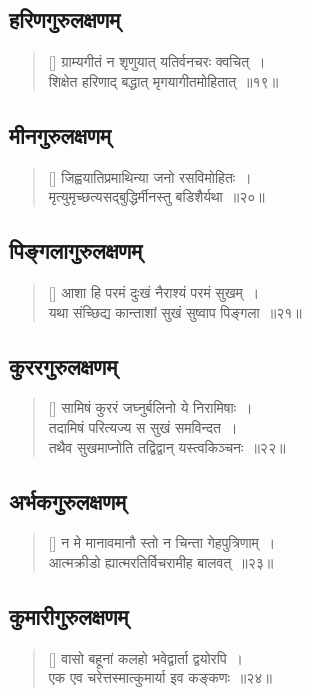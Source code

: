 \documentclass[twoside,12pt,notitlepage]{book}
\begin{document}
\subsection*{हरिणगुरुलक्षणम्}
\begin{verse}[\versewidth]
ग्राम्यगीतं न शृणुयात् यतिर्वनचरः क्वचित्~।\\[-6pt]
शिक्षेत हरिणाद् बद्धात् मृगयागीतमोहितात्~॥१९॥\footA 
\end{verse}


\subsection*{मीनगुरुलक्षणम्}
\begin{verse}[\versewidth]
जिह्वयातिप्रमाथिन्या जनो रसविमोहितः~।\\[-6pt]
मृत्युमृच्छत्यसद्बुद्धिर्मीनस्तु बडिशैर्यथा~॥२०॥\footA 
\end{verse}


\subsection*{पिङ्गलागुरुलक्षणम्}
\begin{verse}[\versewidth]
आशा हि परमं दुःखं नैराश्यं परमं सुखम्~। \\[-6pt]
यथा संच्छिद्य कान्ताशां सुखं सुष्वाप पिङ्गला~॥२१॥\footA 
\end{verse}


\subsection*{कुररगुरुलक्षणम्}
\begin{verse}[\versewidth]
सामिषं कुररं जघ्नुर्बलिनो ये निरामिषाः~।\\[-6pt]
तदामिषं परित्यज्य स सुखं समविन्दत~।\\[-6pt]
तथैव सुखमाप्नोति तद्विद्वान् यस्त्वकिञ्चनः~॥२२॥\footA 
\end{verse}


\subsection*{अर्भकगुरुलक्षणम्}
\begin{verse}[\versewidth]
न मे मानावमानौ स्तो न चिन्ता गेहपुत्रिणाम्~।\\[-6pt]
आत्मक्रीडो ह्यात्मरतिर्विचरामीह बालवत्~॥२३॥\footA 
\end{verse}


\subsection*{कुमारीगुरुलक्षणम्}
\begin{verse}[\versewidth]
वासो बहूनां कलहो भवेद्वार्ता द्वयोरपि~।\\[-6pt]
एक एव चरेत्तस्मात्कुमार्या इव कङ्कणः~॥२४॥\footA 
\end{verse}
\end{document}
